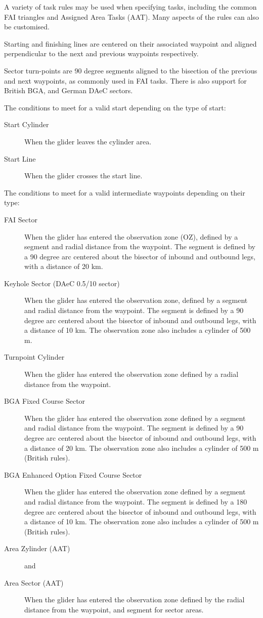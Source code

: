 \documentclass[a4paper,12pt]{refrep}
\begin{document}
A variety of task rules may be used when specifying tasks, including
the common FAI triangles and Assigned Area Tasks (AAT).  Many aspects
of the rules can also be customised.

Starting and finishing lines are centered on their associated waypoint
and aligned perpendicular to the next and previous waypoints
respectively.

Sector turn-points are 90 degree segments aligned to the bisection of
the previous and next waypoints, as commonly used in FAI tasks.
There is also support for British BGA, and German DAeC sectors.

The conditions to meet for a valid start depending on the type of start:
\begin{description}
\item[Start Cylinder] When the glider leaves the cylinder area.
\item[Start Line] When the glider crosses the start line.
\end{description}

The conditions to meet for a valid intermediate waypoints depending on their
 type:
\begin{description}
\item[FAI Sector] When the glider has entered the observation zone (OZ), defined 
by a segment and radial distance from the waypoint.  The segment is
defined by a 90 degree arc centered about the bisector of inbound and
outbound legs, with a distance of 20 km.
\item[Keyhole Sector (DAeC 0.5/10 sector)] When the glider has entered the
observation zone, defined by a segment and radial distance from the waypoint.  The segment is
defined by a 90 degree arc centered about the bisector of inbound and
outbound legs, with a distance of 10 km.  The observation zone also includes
a cylinder of 500 m.
\item[Turnpoint Cylinder]  When the glider has entered the observation zone
defined by a radial distance from the waypoint.
\item[BGA Fixed Course Sector]  When the glider has entered the
observation zone defined by a segment and radial distance from the
waypoint. The segment is defined by a 90 degree arc centered about the
bisector of inbound and outbound legs, with a distance of 20 km.
The observation zone also includes a cylinder of 500 m (British rules).
\item[BGA Enhanced Option Fixed Course Sector]  When the glider has entered the
observation zone defined by a segment and radial distance from the
waypoint. The segment is defined by a 180 degree arc centered about the
bisector of inbound and outbound legs, with a distance of 10 km.
The observation zone also includes a cylinder of 500 m (British rules).
\item[Area Zylinder (AAT)]  and
\item[Area Sector (AAT)]  When the glider has entered the observation zone
defined by the radial distance from the waypoint, and segment for sector areas.
\end{description}
\end{document}
